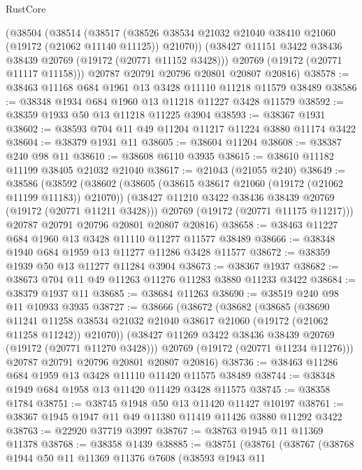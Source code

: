 \begin{lexlean}{RustCore}
\begin{coremodule}
    (@38504
      (@38514
        (@38517 (@38526 @38534 @21032 @21040 @38410 @21060 (@19172 (@21062 @11140 @11125)) @21070))
        (@38427 @11151 @3422 @38436 @38439 @20769 (@19172 (@20771 @11152 @3428)))
        @20769
        (@19172 (@20771 @11117 @11158)))
      @20787
      @20791
      @20796
      @20801
      @20807
      @20816)
@38578 := @38463 @11168 @684 @1961 @13 @3428 @11110 @11218 @11579 @38489
@38586 := @38348 @1934 @684 @1960 @13 @11218 @11227 @3428 @11579
@38592 := @38359 @1933 @50 @13 @11218 @11225 @3904
@38593 := @38367 @1931
@38602 := @38593 @704 @11 @49 @11204 @11217 @11224 @3880 @11174 @3422
@38604 := @38379 @1931 @11
@38605 := @38604 @11204
@38608 := @38387 @240 @98 @11
@38610 := @38608 @6110 @3935
@38615 := @38610 @11182 @11199 @38405 @21032 @21040
@38617 := @21043 (@21055 @240)
@38649 := @38586
    (@38592
      (@38602
        (@38605 (@38615 @38617 @21060 (@19172 (@21062 @11199 @11183)) @21070))
        (@38427 @11210 @3422 @38436 @38439 @20769 (@19172 (@20771 @11211 @3428)))
        @20769
        (@19172 (@20771 @11175 @11217)))
      @20787
      @20791
      @20796
      @20801
      @20807
      @20816)
@38658 := @38463 @11227 @684 @1960 @13 @3428 @11110 @11277 @11577 @38489
@38666 := @38348 @1940 @684 @1959 @13 @11277 @11286 @3428 @11577
@38672 := @38359 @1939 @50 @13 @11277 @11284 @3904
@38673 := @38367 @1937
@38682 := @38673 @704 @11 @49 @11263 @11276 @11283 @3880 @11233 @3422
@38684 := @38379 @1937 @11
@38685 := @38684 @11263
@38690 := @38519 @240 @98 @11 @10933 @3935
@38727 := @38666
    (@38672
      (@38682
        (@38685
          (@38690
            @11241
            @11258
            @38534
            @21032
            @21040
            @38617
            @21060
            (@19172 (@21062 @11258 @11242))
            @21070))
        (@38427 @11269 @3422 @38436 @38439 @20769 (@19172 (@20771 @11270 @3428)))
        @20769
        (@19172 (@20771 @11234 @11276)))
      @20787
      @20791
      @20796
      @20801
      @20807
      @20816)
@38736 := @38463 @11286 @684 @1959 @13 @3428 @11110 @11420 @11575 @38489
@38744 := @38348 @1949 @684 @1958 @13 @11420 @11429 @3428 @11575
@38745 := @38358 @1784
@38751 := @38745 @1948 @50 @13 @11420 @11427 @10197
@38761 := @38367 @1945 @1947 @11 @49 @11380 @11419 @11426 @3880 @11292 @3422
@38763 := @22920 @37719 @3997
@38767 := @38763 @1945 @11 @11369 @11378
@38768 := @38358 @1439
@38885 := @38751
    (@38761
      (@38767
        (@38768
          @1944
          @50
          @11
          @11369
          @11376
          @7608
          (@38593
            @1943
            @11

\end{coremodule}
\end{lexlean}
